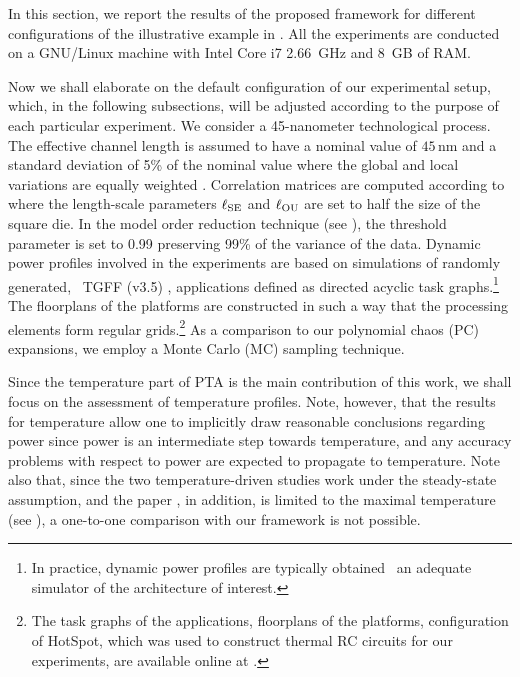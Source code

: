 
In this section, we report the results of the proposed framework for different configurations of the illustrative example in .
All the experiments are conducted on a GNU/Linux machine with Intel Core i7 2.66~GHz and 8~GB of RAM.

Now we shall elaborate on the default configuration of our experimental setup, which, in the following subsections, will be adjusted according to the purpose of each particular experiment.
We consider a 45-nanometer technological process.
The effective channel length is assumed to have a nominal value of $45\,\text{nm}$ and a standard deviation of 5\% of the nominal value where the global and local variations are equally weighted \cite{juan2011, juan2012}.
Correlation matrices are computed according to  where the length-scale parameters $\ell_{\text{SE}}$ and $\ell_{\text{OU}}$ are set to half the size of the square die.
In the model order reduction technique (see ), the threshold parameter is set to 0.99 preserving 99\% of the variance of the data.
Dynamic power profiles involved in the experiments are based on simulations of randomly generated, \via\ TGFF (v3.5) \cite{dick1998}, applications defined as directed acyclic task graphs.\footnote{In practice, dynamic power profiles are typically obtained \via\ an adequate simulator of the architecture of interest.}
The floorplans of the platforms are constructed in such a way that the processing elements form regular grids.\footnote{The task graphs of the applications, floorplans of the platforms, configuration of HotSpot, which was used to construct thermal RC circuits for our experiments, are available online at \cite{sources}.}
As a comparison to our polynomial chaos (PC) expansions, we employ a Monte Carlo (MC) sampling technique.

Since the temperature part of PTA is the main contribution of this work, we shall focus on the assessment of temperature profiles.
Note, however, that the results for temperature allow one to implicitly draw reasonable conclusions regarding power since power is an intermediate step towards temperature, and any accuracy problems with respect to power are expected to propagate to temperature.
Note also that, since the two temperature-driven studies \cite{juan2011, juan2012} work under the steady-state assumption, and the paper \cite{juan2011}, in addition, is limited to the maximal temperature (see ), a one-to-one comparison with our framework is not possible.

